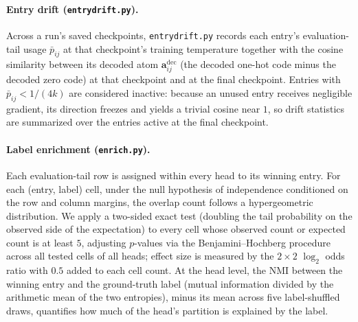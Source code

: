 \paragraph{Entry drift (\texttt{entrydrift.py}).}
Across a run's saved checkpoints, \texttt{entrydrift.py} records each
entry's evaluation-tail usage $\bar{p}_{ij}$ at that checkpoint's training
temperature together with the cosine similarity between its decoded atom
$\mathbf{a}^{\mathrm{dec}}_{ij}$ (the decoded one-hot code minus the
decoded zero code) at that checkpoint and at the final checkpoint. Entries
with $\bar{p}_{ij} < 1/(4k)$ are considered inactive: because an unused
entry receives negligible gradient, its direction freezes and yields a
trivial cosine near $1$, so drift statistics are summarized over the
entries active at the final checkpoint.

\paragraph{Label enrichment (\texttt{enrich.py}).}
Each evaluation-tail row is assigned within every head to its winning
entry. For each (entry, label) cell, under the null hypothesis of
independence conditioned on the row and column margins, the overlap count
follows a hypergeometric distribution. We apply a two-sided exact test
(doubling the tail probability on the observed side of the expectation) to
every cell whose observed count or expected count is at least $5$,
adjusting $p$-values via the Benjamini--Hochberg procedure across all
tested cells of all heads; effect size is measured by the $2\times 2$
$\log_2$ odds ratio with $0.5$ added to each cell count. At the head level,
the NMI between the winning entry and the ground-truth label (mutual
information divided by the arithmetic mean of the two entropies), minus its
mean across five label-shuffled draws, quantifies how much of the head's
partition is explained by the label.

